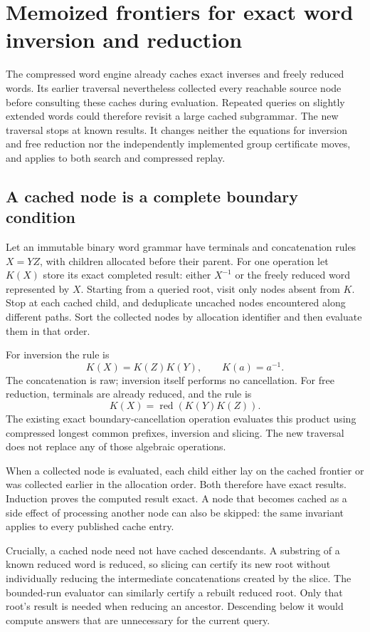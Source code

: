 \section{Memoized frontiers for exact word inversion and reduction}
\label{sec:word-cache-frontier}

The compressed word engine already caches exact inverses and freely reduced
words. Its earlier traversal nevertheless collected every reachable source
node before consulting these caches during evaluation. Repeated queries on
slightly extended words could therefore revisit a large cached subgrammar.
The new traversal stops at known results. It changes neither the equations
for inversion and free reduction nor the independently implemented group
certificate moves, and applies to both search and compressed replay.

\subsection{A cached node is a complete boundary condition}

Let an immutable binary word grammar have terminals and concatenation rules
$X=YZ$, with children allocated before their parent. For one operation let
$K(X)$ store its exact completed result: either $X^{-1}$ or the freely reduced
word represented by $X$. Starting from a queried root, visit only nodes absent
from $K$. Stop at each cached child, and deduplicate uncached nodes encountered
along different paths. Sort the collected nodes by allocation identifier and
then evaluate them in that order.

For inversion the rule is
\[
 K(X)=K(Z)K(Y),\qquad K(a)=a^{-1}.
\]
The concatenation is raw; inversion itself performs no cancellation. For free
reduction, terminals are already reduced, and the rule is
\[
 K(X)=\operatorname{red}(K(Y)K(Z)).
\]
The existing exact boundary-cancellation operation evaluates this product
using compressed longest common prefixes, inversion and slicing.
The new traversal does not replace any of those algebraic operations.

When a collected node is evaluated, each child either lay on the cached
frontier or was collected earlier in the allocation order. Both therefore
have exact results. Induction proves the computed result exact. A node that
becomes cached as a side effect of processing another node can also be skipped:
the same invariant applies to every published cache entry.

Crucially, a cached node need not have cached descendants. A substring of a
known reduced word is reduced, so slicing can certify its new root without
individually reducing the intermediate concatenations created by the slice.
The bounded-run evaluator can similarly certify a rebuilt reduced root.
Only that root's result is needed when reducing an ancestor. Descending below
it would compute answers that are unnecessary for the current query.

